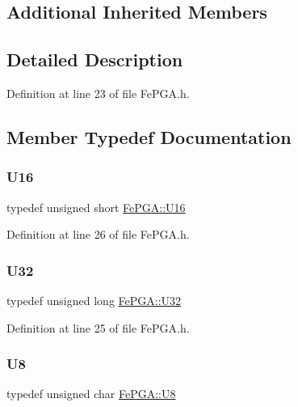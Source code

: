 \subsection*{Additional Inherited Members}


\subsection{Detailed Description}


Definition at line 23 of file Fe\+P\+G\+A.\+h.



\subsection{Member Typedef Documentation}
\mbox{\label{classFePGA_ac84b20a342a6c963cba061c8bdc37651}} 
\subsubsection{\texorpdfstring{U16}{U16}}
{\footnotesize\ttfamily typedef unsigned short \hyperlink{classFePGA_ac84b20a342a6c963cba061c8bdc37651}{Fe\+P\+G\+A\+::\+U16}}



Definition at line 26 of file Fe\+P\+G\+A.\+h.

\mbox{\label{classFePGA_a1d44a0b27d13179bb1dceb5ec6f4cc1f}} 
\subsubsection{\texorpdfstring{U32}{U32}}
{\footnotesize\ttfamily typedef unsigned long \hyperlink{classFePGA_a1d44a0b27d13179bb1dceb5ec6f4cc1f}{Fe\+P\+G\+A\+::\+U32}}



Definition at line 25 of file Fe\+P\+G\+A.\+h.

\mbox{\label{classFePGA_ab65d84dbbc4b5711eb4d85d00c5abfa2}} 
\subsubsection{\texorpdfstring{U8}{U8}}
{\footnotesize\ttfamily typedef unsigned char \hyperlink{classFePGA_ab65d84dbbc4b5711eb4d85d00c5abfa2}{Fe\+P\+G\+A\+::\+U8}}



